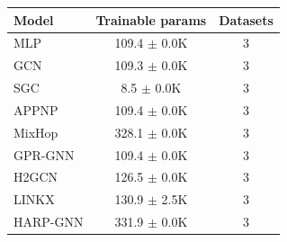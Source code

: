 \begin{tabular}{lcc}
\toprule
Model & Trainable params & Datasets \\
\midrule
MLP & 109.4 $\pm$ 0.0K & 3 \\
GCN & 109.3 $\pm$ 0.0K & 3 \\
SGC & 8.5 $\pm$ 0.0K & 3 \\
APPNP & 109.4 $\pm$ 0.0K & 3 \\
MixHop & 328.1 $\pm$ 0.0K & 3 \\
GPR-GNN & 109.4 $\pm$ 0.0K & 3 \\
H2GCN & 126.5 $\pm$ 0.0K & 3 \\
LINKX & 130.9 $\pm$ 2.5K & 3 \\
HARP-GNN & 331.9 $\pm$ 0.0K & 3 \\
\bottomrule
\end{tabular}
